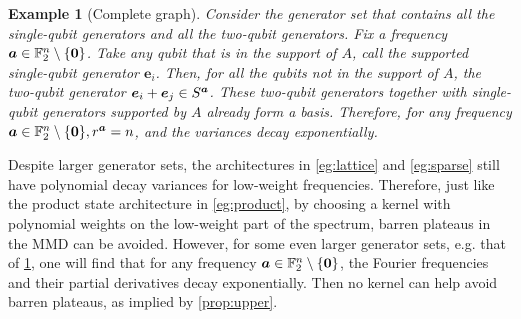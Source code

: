 \documentclass{article}
\theoremstyle{plain}
\newtheorem{example}[theorem]{Example}
\theoremstyle{definition}
\theoremstyle{remark}
\begin{document}
\begin{example}[Complete graph] \label{eg:complete} Consider the generator set that contains all the single-qubit generators and all the two-qubit generators. Fix a frequency ${\bm{a}} \in \mathbb{F}_2^n \setminus \{\bm{0}\}$. Take any qubit that is in the support of $A$, call the supported single-qubit generator $\bm{e}_i$. Then, for all the qubits not in the support of $A$, the two-qubit generator $\bm{e}_i+\bm{e}_j \in S^{\bm{a}}$. These two-qubit generators together with single-qubit generators supported by $A$ already form a basis. Therefore, for any frequency ${\bm{a}} \in \mathbb{F}_2^n \setminus \{\bm{0}\}, r^{\bm{a}} =n$, and the variances decay exponentially. 
\end{example}

Despite larger generator sets, the architectures in \cref{eg:lattice} and \cref{eg:sparse} still have polynomial decay variances for low-weight frequencies. Therefore, just like the product state architecture in \cref{eg:product}, by choosing a kernel with polynomial weights on the low-weight part of the spectrum, barren plateaus in the MMD can be avoided. However, for some even larger generator sets, e.g. that of \cref{eg:complete}, one will find that for any frequency ${\bm{a}} \in \mathbb{F}_2^n \setminus \{\bm{0}\}$, the Fourier frequencies and their partial derivatives decay exponentially. Then no kernel can help avoid barren plateaus, as implied by \cref{prop:upper}. 

 
\end{document}
